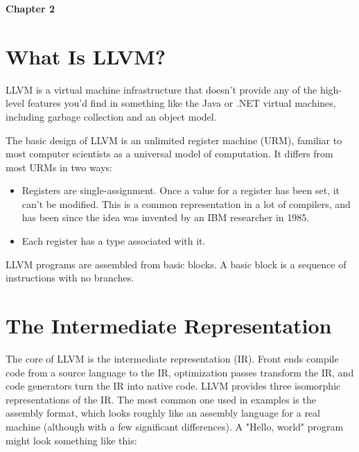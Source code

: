 \documentclass[a4paper,10pt]{article}
\begin{document}
\begin{center}
{\bf {\LARGE Chapter 2}\linebreak{}}
\linebreak
\linebreak
\end{center}

\section{What Is LLVM?}
LLVM is a virtual machine infrastructure that doesn’t provide any of the high-level features you’d find in something like the Java or .NET virtual machines, including garbage collection and an object model.

The basic design of LLVM is an unlimited register machine (URM), familiar to most computer scientists as a universal model of computation. It differs from most URMs in two ways:

\begin{itemize}
\item Registers are single-assignment. Once a value for a register has been set, it can’t be modified. This is a common representation in a lot of compilers, and has been since the idea was invented by an IBM researcher in 1985.
\item Each register has a type associated with it.
\end{itemize}

LLVM programs are assembled from basic blocks. A basic block is a sequence of instructions with no branches.

\section{The Intermediate Representation}

The core of LLVM is the intermediate representation (IR). Front ends compile code from a source language to the IR, optimization passes transform the IR, and code generators turn the IR into native code.
LLVM provides three isomorphic representations of the IR. The most common one used in examples is the assembly format, which looks roughly like an assembly language for a real machine (although with a few significant differences). A "Hello, world" program might look something like this:
\end{document}
